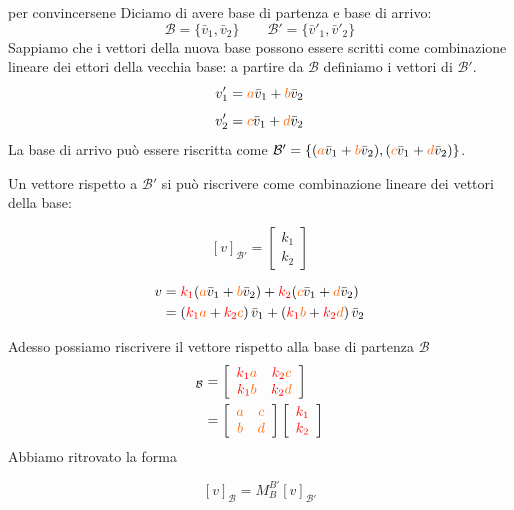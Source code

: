 \documentclass[x11names]{article}
\begin{document}
\begin{es}{per convincersene}
Diciamo di avere base di partenza e base di arrivo:
\[
\mathscr{B} = \{\bar{v}_{1},\bar{v}_{2}\} \qquad \mathscr{B}' = \{\bar{v}'_{1},\bar{v}'_{2}\}
\]
Sappiamo che i vettori della nuova base possono essere scritti come combinazione lineare dei ettori della vecchia base: a partire da $\mathcal{B}$ definiamo i vettori di $\mathcal{B}'$.
\[
v'_{1} = \textcolor{myorange}{a}\bar{v}_{1} + \textcolor{myorange}{b}\bar{v}_{2}
\]
\[
v'_{2} = \textcolor{myorange}{c}\bar{v}_{1} + \textcolor{myorange}{d}\bar{v}_{2}
\]
La base di arrivo può essere riscritta come $ \mathcal{B}' = \left\{(\textcolor{myorange}{a}\bar{v}_{1} + \textcolor{myorange}{b}\bar{v}_{2}),(\textcolor{myorange}{c}\bar{v}_{1} + \textcolor{myorange}{d}\bar{v}_{2}) \right\}$.

Un vettore rispetto a $\mathcal{B}'$ si può riscrivere come combinazione lineare dei vettori della base:

\[
\left[v\right]_{\mathcal{B}'}  = \left[\begin{array}{c}
		k_{1} \\ k_{2}
\end{array} \right]
\]

\begin{align*}
	v &= \textcolor{red}{k_{1}}(\textcolor{myorange}{a}\bar{v}_{1} + \textcolor{myorange}{b}\bar{v}_{2}) + \textcolor{red}{k_{2}}(\textcolor{myorange}{c}\bar{v}_{1} + \textcolor{myorange}{d}\bar{v}_{2}) \\
	&= \left(\textcolor{red}{k_{1}}\textcolor{myorange}{a} + \textcolor{red}{k_{2}}\textcolor{myorange}{c}\right)\bar{v}_{1} + 
	\left(\textcolor{red}{k_{1}}\textcolor{myorange}{b} + \textcolor{red}{k_{2}}\textcolor{myorange}{d} \right)\bar{v}_{2} 
\end{align*}
\end{es}
\begin{es}
	
Adesso possiamo riscrivere il vettore rispetto alla base di partenza $\mathcal{B}$
\begin{align*}
[v]_{\mathcal{B}} &= \left[\begin{array}{cc}
	\textcolor{red}{k_{1}}\textcolor{myorange}{a} & \textcolor{red}{k_{2}}\textcolor{myorange}{c} \\
	\textcolor{red}{k_{1}}\textcolor{myorange}{b} & \textcolor{red}{k_{2}}\textcolor{myorange}{d}
\end{array}\right] \\
	&=\left[\begin{array}{cc}
		\textcolor{myorange}{a} & \textcolor{myorange}{c} \\
		\textcolor{myorange}{b} &\textcolor{myorange}{d}
	\end{array}\right]
	\left[
	\begin{array}{c}
		\textcolor{red}{k_{1}}\\
		\textcolor{red}{k_{2}}
	\end{array}\right]
\end{align*}
Abbiamo ritrovato la forma

\[
[v]_{\mathcal{B}} =  M_{B}^{B'} [v]_{\mathcal{B}'}
\] 

\end{es}
\end{document}
